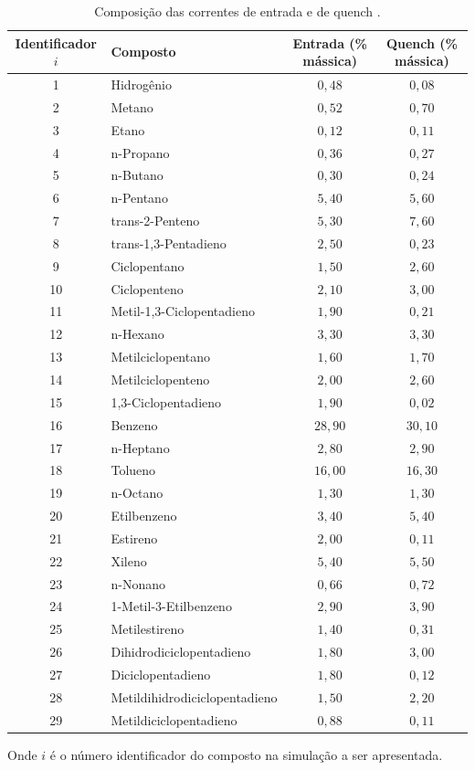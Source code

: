 \begin{table}[!htb]
\begin{center}
\caption{Composição das correntes de entrada e de quench \cite{Rojas2014a}.}
\label{tab:composicao}
\small
\begin{tabular}{clcc}
{Identificador $i$} & {Composto} & Entrada (\% mássica) & Quench (\% mássica)
\\
\hline
1 & Hidrogênio				& $0,48$ & $0,08$ \\
2 & Metano					& $0,52$ & $0,70$ \\
3 & Etano					& $0,12$ & $0,11$ \\
4 & n-Propano				& $0,36$ & $0,27$ \\
5 & n-Butano				& $0,30$ & $0,24$ \\
6 & n-Pentano				& $5,40$ & $5,60$ \\
7 & trans-2-Penteno			& $5,30$ & $7,60$\\
8 & trans-1,3-Pentadieno	& $2,50$ & $0,23$ \\
9 & Ciclopentano			& $1,50$ & $2,60$ \\
10& Ciclopenteno			& $2,10$ & $3,00$ \\
11& Metil-1,3-Ciclopentadieno	& $1,90$ & $0,21$ \\
12& n-Hexano				& $3,30$ & $3,30$ \\
13& Metilciclopentano		& $1,60$ & $1,70$ \\
14& Metilciclopenteno		& $2,00$ & $2,60$ \\
15& 1,3-Ciclopentadieno		& $1,90$ & $0,02$ \\
16& Benzeno					& $28,90$ & $30,10$ \\
17& n-Heptano				& $2,80$ & $2,90$ \\
18& Tolueno					& $16,00$ & $16,30$ \\
19& n-Octano				& $1,30$ & $1,30$ \\
20& Etilbenzeno				& $3,40$ & $5,40$ \\
21& Estireno				& $2,00$ & $0,11$ \\
22& Xileno					& $5,40$ & $5,50$ \\
23& n-Nonano				& $0,66$ & $0,72$ \\
24& 1-Metil-3-Etilbenzeno	& $2,90$ & $3,90$ \\
25& Metilestireno			& $1,40$ & $0,31$ \\
26& Dihidrodiciclopentadieno	& $1,80$ & $3,00$ \\
27& Diciclopentadieno		& $1,80$ & $0,12$ \\
28& Metildihidrodiciclopentadieno	& $1,50$ & $2,20$ \\
29& Metildiciclopentadieno	& $0,88$ & $0,11$ \\
\bottomrule
\end{tabular}
\end{center}
Onde $i$ é o número identificador do composto na simulação a ser apresentada.
\end{table}

